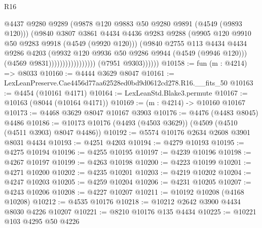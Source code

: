 \begin{lexlean}{R16}
\begin{coremodule}
                                          @4437
                                          @9280
                                          @9289
                                          (@9878 @120 @9883 @50 @9280 @9891 (@4549 (@9893 @120)))
                                          (@9840
                                            @3807
                                            @3861
                                            @4434
                                            @4436
                                            @9283
                                            @9288
                                            (@9905 @120 @9910 @50 @9283 @9918 (@4549 (@9920 @120)))
                                            (@9840
                                              @2755
                                              @113
                                              @4434
                                              @4434
                                              @9286
                                              @4203
                                              (@9932
                                                @120
                                                @9936
                                                @50
                                                @9286
                                                @9944
                                                (@4549 (@9946 @120)))
                                              (@4569 @9831)))))))))))))))))
              (@7951 @9303))))))
@10158 := fun (m : @4214) => @8033
@10160 := @4444 @3629 @8047
@10161 := LexLeanPreserve.Cae4456d77aa62528ed0bd9d0612cd278.R16.__fits_50
@10163 := @4454 (@10161 @4171)
@10164 := LexLeanStd.Blake3.permute
@10167 := @10163 (@8044 (@10164 @4171))
@10169 := (m : @4214) -> @10160 @10167
@10173 := @4468 @3629 @8047 @10167 @3903
@10176 := @4476 (@4483 @8045) @4486
@10186 := @10173 @10176 (@4493 (@4503 @3629)) (@4509 (@4510 (@4511 @3903) @8047 @4486))
@10192 := @5574 @10176 @2634 @2608 @3901 @8031 @4434
@10193 := @4251 @4203
@10194 := @4279 @10193
@10195 := @4275 @10194
@10196 := @4255 @10195
@10197 := @4239 @10196
@10198 := @4267 @10197
@10199 := @4263 @10198
@10200 := @4223 @10199
@10201 := @4271 @10200
@10202 := @4235 @10201
@10203 := @4219 @10202
@10204 := @4247 @10203
@10205 := @4259 @10204
@10206 := @4231 @10205
@10207 := @4243 @10206
@10208 := @4227 @10207
@10211 := @10192 @10208 (@4168 @10208)
@10212 := @4535 @10176
@10218 := @10212 @2642 @3900 @4434 @8030 @4226 @10207
@10221 := @8210 @10176 @135 @4434
@10225 := @10221 @103 @4295 @50 @4226

\end{coremodule}
\end{lexlean}
